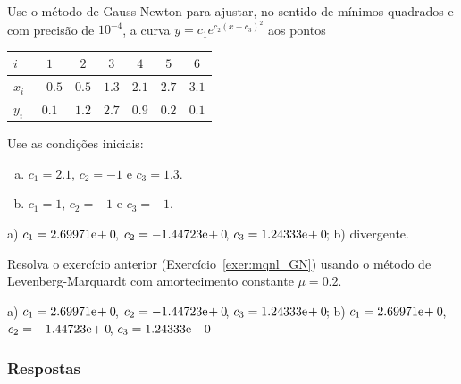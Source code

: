 \begin{exer}\label{exer:mqnl_GN}
  Use o método de Gauss-Newton para ajustar, no sentido de mínimos quadrados e com precisão de $10^{-4}$, a curva $y = c_1e^{c_2(x-c_3)^2}$ aos pontos
  \begin{center}
    \begin{tabular}{l|cccccc}
      $i$ & $1$ & $2$ & $3$ & $4$ & $5$ & $6$ \\\hline
      $x_i$ & $-0.5$ & $0.5$ & $1.3$ & $2.1$ & $2.7$ & $3.1$ \\
      $y_i$ & $0.1$ & $1.2$ & $2.7$ & $0.9$ & $0.2$ & $0.1$ \\\hline
    \end{tabular}
  \end{center}
Use as condições iniciais:
\begin{enumerate}[a)]
\item $c_1 = 2.1$, $c_2=-1$ e $c_3=1.3$.
\item $c_1=1$, $c_2=-1$ e $c_3=-1$.
\end{enumerate}
\end{exer}
\begin{resp}
  a) $c_1 = 2.69971\mathrm{e}\!+0\!$, $c_2 = -1.44723\mathrm{e}\!+0\!$, $c_3 = 1.24333\mathrm{e}\!+0\!$; b) divergente.
\end{resp}

\begin{exer}
  Resolva o exercício anterior (Exercício~\ref{exer:mqnl_GN}) usando o método de Levenberg-Marquardt com amortecimento constante $\mu=0.2$.
\end{exer}
\begin{resp}
  a)  $c_1 = 2.69971\mathrm{e}\!+0\!$, $c_2 = -1.44723\mathrm{e}\!+0\!$, $c_3 = 1.24333\mathrm{e}\!+0\!$; b) $c_1 = 2.69971\mathrm{e}\!+0\!$, $c_2 = -1.44723\mathrm{e}\!+0\!$, $c_3 = 1.24333\mathrm{e}\!+0\!$
\end{resp}

\ifisbook
\subsubsection{Respostas}
\shipoutAnswer
\fi

